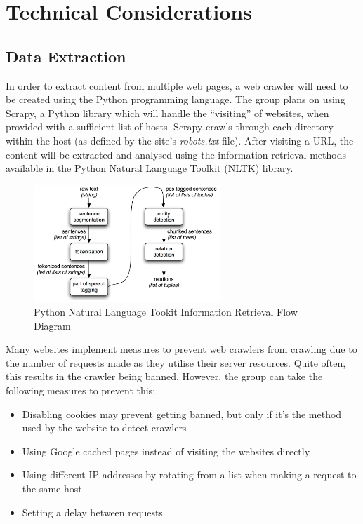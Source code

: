 \section{Technical Considerations}

\subsection{Data Extraction}

In order to extract content from multiple web pages, a web crawler will need to be created using the Python programming language. The group plans on using Scrapy, a Python library which will handle the "`visiting"' of websites, when provided with a sufficient list of hosts. Scrapy crawls through each directory within the host (as defined by the site's \textsl{robots.txt} file). After visiting a URL, the content will be extracted and analysed using the information retrieval methods available in the Python Natural Language Toolkit (NLTK) library.

\begin{figure}
  \centering
  \begin{minipage}{7cm}
    \centering
    \includegraphics[width=7cm]{inc/ie-architecture.jpg}
    \caption{Python Natural Language Tookit Information Retrieval Flow Diagram}
    \label{fig:information_retrieval}
  \end{minipage}
\end{figure}

Many websites implement measures to prevent web crawlers from crawling due to the number of requests made as they utilise their server resources. Quite often, this results in the crawler being banned. However, the group can take the following measures to prevent this:

\begin{itemize}
  \item Disabling cookies may prevent getting banned, but only if it’s the method used by the website to detect crawlers
  \item Using Google cached pages instead of visiting the websites directly
  \item Using different IP addresses by rotating from a list when making a request to the same host
  \item Setting a delay between requests
\end{itemize}

